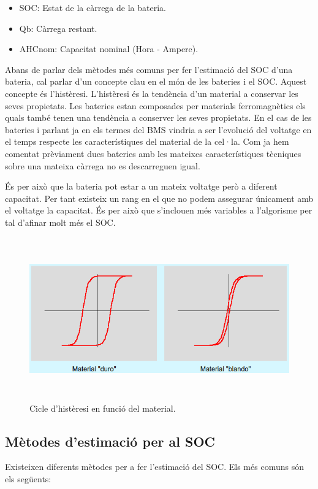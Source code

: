 \begin{itemize}
    \item SOC: Estat de la càrrega de la bateria.
    \item Qb: Càrrega restant.
    \item AHCnom: Capacitat nominal (Hora - Ampere).
\end{itemize}

Abans de parlar dels mètodes més comuns per fer l'estimació del SOC d'una bateria, cal parlar d'un concepte clau en el món de les bateries i el SOC. Aquest concepte és l'histèresi. L'histèresi és la tendència d'un material a conservar les seves propietats. Les bateries estan composades per materials ferromagnètics els quals també tenen una tendència a conserver les seves propietats. En el cas de les bateries i parlant ja en els termes del BMS vindria a ser l'evolució del voltatge en el temps respecte les característiques del material de la cel·la. Com ja hem comentat prèviament dues bateries amb les mateixes característiques tècniques sobre una mateixa càrrega no es descarreguen igual.

És per això que la bateria pot estar a un mateix voltatge però a diferent capacitat. Per tant existeix un rang en el que no podem assegurar únicament amb el voltatge la capacitat. És per això que s'inclouen més variables a l'algorisme per tal d'afinar molt més el SOC.

\begin{figure}[H]
	\centering
    \includegraphics[width=\textwidth, height=7cm] {BMS/histeresis.png}
    \caption{Cicle d'histèresi en funció del material.}
\end{figure}

\subsection{Mètodes d'estimació per al SOC}
Existeixen diferents mètodes per a fer l'estimació del SOC. Els més comuns són els següents:


